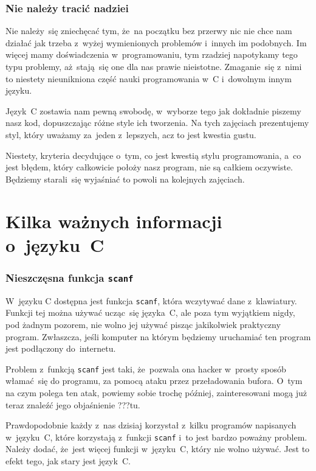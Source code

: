 \documentclass[10pt,t]{beamer}
\begin{document}
\begin{frame}
  \frametitle{Nie należy tracić nadziei}


  Nie należy~się zniechęcać tym, że~na początku bez przerwy nic nie chce
  nam działać jak trzeba z~wyżej wymienionych problemów i~innych im
  podobnych. Im więcej mamy doświadczenia w~programowaniu, tym rzadziej
  napotykamy tego typu problemy, aż~stają~się one dla nas prawie nieistotne.
  Zmaganie~się z~nimi to niestety nieunikniona część nauki programowania
  w~C i~dowolnym innym języku.

  Język~C zostawia nam pewną swobodę, w~wyborze tego jak dokładnie piszemy
  nasz kod, dopuszczając różne \alert{style} ich tworzenia. Na tych
  zajęciach prezentujemy styl, który uważamy za~jeden z~lepszych, acz to
  jest kwestia gustu.

  Niestety, kryteria decydujące o~tym, co jest kwestią stylu programowania,
  a~co jest błędem, który całkowicie położy nasz program, nie są całkiem
  oczywiste. Będziemy starali~się wyjaśniać to powoli na kolejnych zajęciach.

\end{frame}









\section{Kilka ważnych informacji o~języku~C}


\begin{frame}
  \frametitle{Nieszczęsna funkcja \texttt{scanf}}


  W~języku C dostępna jest funkcja \texttt{scanf}, która wczytywać dane
  z~klawiatury. Funkcji tej można używać ucząc~się języka~C, ale poza
  tym wyjątkiem \alert{nigdy}, \alert{pod żadnym pozorem}, \alert{nie wolno}
  jej używać pisząc jakikolwiek praktyczny program. Zwłaszcza, jeśli
  komputer na którym będziemy uruchamiać ten program jest podłączony
  do~internetu.

  Problem z~funkcją \texttt{scanf} jest taki, że~pozwala ona hacker
  w~prosty sposób włamać~się do programu, za pomocą ataku przez
  przeładowania bufora. O~tym na czym polega ten atak, powiemy sobie trochę
  później, zainteresowani mogą już teraz znaleźć jego objaśnienie ???tu.

  Prawdopodobnie każdy z~nas dzisiaj korzystał z~kilku programów napisanych
  w~języku~C, które korzystają z~funkcji \texttt{scanf} i~to jest bardzo
  poważny \alert{problem}. Należy dodać, że~jest \alert{więcej} funkcji
  w~języku~C, który \alert{nie wolno} używać. Jest to efekt tego, jak stary
  jest język~C.

\end{frame}
\end{document}
